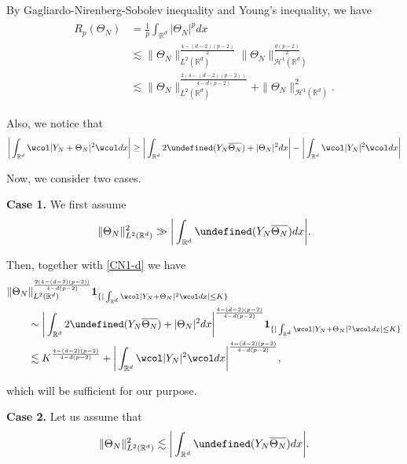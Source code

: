 \documentclass[%
11pt,  reqno]{amsart}
\theoremstyle{remarkstyle}
\newcommand{\1}{\hspace{0.2mm}\text{I}\hspace{0.2mm}}
\newcommand{\noi}{\noindent}
\newcommand{\R}{\mathbb{R}}
\let\Re=\undefined\DeclareMathOperator*{\Re}{Re}
\newcommand{\wick}[1]{\wcol#1\wcol}
\newcommand{\les}{\lesssim}
\newcommand{\ind}{\mathbf 1}
\renewcommand{\H}{\mathcal{H}}
\numberwithin{equation}{section}
\numberwithin{theorem}{section}
\begin{document}
	\noi 
	By Gagliardo-Nirenberg-Sobolev inequality and Young's inequality, we have
	\begin{align}
		\begin{split}
			R_p(\Theta_N) & = \frac1 p \int_{\R^d} |\Theta_N|^p dx  \\
			& \les  \|\Theta_N \|_{L^2(\R^d)}^{\frac{4-(d-2)(p-2)}{2}}   \|\Theta_N \|_{\H^{1}(\R^d)}^{\frac{d(p-2)}2} \\
			& \les  \| \Theta_N\|_{L^2(\R^d)}^{\frac{2(4-(d-2)(p-2))}{4-d(p-2)}} +  \|\Theta_N \|_{\H^1(\R^d)}^2.
		\end{split}
		\label{CN1_1-d}
	\end{align}
	
	\noi 
	Also, we notice that
	\begin{align}
		\bigg| \int_{\R^d} \wick{|Y_N + \Theta_N|^2 } dx \bigg| \ge \bigg| \int_{\R^d} 2 \Re(Y_N \overline{\Theta_N}) + |\Theta_N|^2   dx \bigg|  - \bigg| \int_{\R^d} \wick{ |Y_N |^2 } dx \bigg| 
		\label{CN1-d}
	\end{align}
	
	Now, we consider two cases.
	
	{\bf Case 1.} We first assume 
	\begin{align} 
		\| \Theta_N\|_{L^2(\R^d)}^2 \gg \bigg| \int_{\R^d} \Re(Y_N \overline{\Theta_N}) dx \bigg|.
	\end{align}
	
	\noi 
	Then, together with \eqref{CN1-d} we have
	\begin{align}
		\begin{split}
			\| \Theta_N & \|_{L^2(\R^d)}^{\frac{2(4-(d-2)(p-2))}{4-d(p-2)}} \ind_{\{ | \int_{\R^d} \wick{ |Y_N + \Theta_N|^2 } dx | \le K  \}} \\
			& \sim \bigg| \int_{\R^d} 2 \Re(Y_N \overline{\Theta_N}) + |\Theta_N|^2 dx\bigg|^{\frac{4-(d-2)(p-2)}{4-d(p-2)}} \ind_{\{ | \int_{\R^d} \wick{ |Y_N + \Theta_N|^2 } dx | \le K  \}} \\
			& \les K^{\frac{4-(d-2)(p-2)}{4-d(p-2)}} + \bigg| \int_{\R^d} \wick{ |Y_N |^2 } dx \bigg|^{\frac{4-(d-2)(p-2)}{4-d(p-2)}},
		\end{split}
		\label{CN1_2-d}
	\end{align}
	
	\noi 
	which will be sufficient for our purpose.
	
	{\bf Case 2.} Let us assume that
	\begin{align}
		\| \Theta_N\|_{L^2(\R^d)}^2 \les \bigg| \int_{\R^d} \Re(Y_N \overline{\Theta_N}) dx \bigg|.
		\label{CN2-d}
	\end{align}
	
\end{document}
